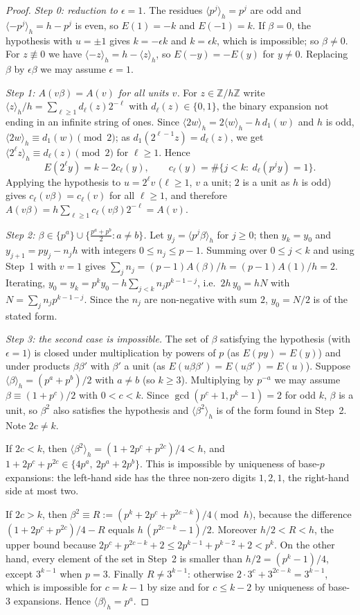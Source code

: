 \documentclass[11pt]{amsart}
\theoremstyle{definition}
\theoremstyle{remark}
\numberwithin{equation}{section}
\newcommand{\Z}{\mathbb{Z}}
\newcommand{\res}[2]{\langle #1\rangle_{#2}}
\begin{document}
\begin{proof}
\emph{Step 0: reduction to $\epsilon=1$.} The residues $\res{p^j}{h}=p^j$ are odd and $\res{-p^j}{h}=h-p^j$ is even, so $E(1)=-k$
and $E(-1)=k$. If $\beta=0$, the hypothesis with $u=\pm1$ gives $k=-\epsilon k$ and $k=\epsilon k$, which is impossible; so
$\beta\ne0$. For $z\not\equiv0$ we have $\res{-z}{h}=h-\res{z}{h}$, so $E(-y)=-E(y)$ for $y\ne0$. Replacing $\beta$ by $\epsilon\beta$
we may assume $\epsilon=1$.

\emph{Step 1: $A(v\beta)=A(v)$ for all units $v$.} For $z\in\Z/h\Z$ write $\res{z}{h}/h=\sum_{\ell\ge1}d_\ell(z)2^{-\ell}$ with
$d_\ell(z)\in\{0,1\}$, the binary expansion not ending in an infinite string of ones. Since
$\res{2w}{h}=2\res{w}{h}-h\,d_1(w)$ and $h$ is odd, $\res{2w}{h}\equiv d_1(w)\pmod 2$; as $d_1(2^{\ell-1}z)=d_\ell(z)$, we get
$\res{2^\ell z}{h}\equiv d_\ell(z)\pmod2$ for $\ell\ge1$. Hence
\[
E(2^\ell y)=k-2c_\ell(y),\qquad c_\ell(y)=\#\{j<k:\ d_\ell(p^jy)=1\}.
\]
Applying the hypothesis to $u=2^\ell v$ ($\ell\ge1$, $v$ a unit; $2$ is a unit as $h$ is odd) gives $c_\ell(v\beta)=c_\ell(v)$ for
all $\ell\ge1$, and therefore $A(v\beta)=h\sum_{\ell\ge1}c_\ell(v\beta)2^{-\ell}=A(v)$.

\emph{Step 2: $\beta\in\{p^a\}\cup\{\frac{p^a+p^b}{2}:a\ne b\}$.} Let $y_j=\res{p^j\beta}{h}$ for $j\ge0$; then $y_k=y_0$ and
$y_{j+1}=py_j-n_jh$ with integers $0\le n_j\le p-1$. Summing over $0\le j<k$ and using Step~1 with $v=1$ gives
$\sum_jn_j=(p-1)A(\beta)/h=(p-1)A(1)/h=2$. Iterating, $y_0=y_k=p^ky_0-h\sum_{j<k}n_jp^{k-1-j}$, i.e.\ $2h\,y_0=hN$ with
$N=\sum_jn_jp^{k-1-j}$. Since the $n_j$ are non-negative with sum $2$, $y_0=N/2$ is of the stated form.

\emph{Step 3: the second case is impossible.} The set of $\beta$ satisfying the hypothesis (with $\epsilon=1$) is closed under
multiplication by powers of $p$ (as $E(py)=E(y)$) and under products $\beta\beta'$ with $\beta'$ a unit (as
$E(u\beta\beta')=E(u\beta')=E(u)$). Suppose $\res{\beta}{h}=(p^a+p^b)/2$ with $a\ne b$ (so $k\ge3$). Multiplying by $p^{-a}$ we may
assume $\beta\equiv(1+p^c)/2$ with $0<c<k$. Since $\gcd(p^c+1,p^k-1)=2$ for odd $k$, $\beta$ is a unit, so $\beta^2$ also satisfies
the hypothesis and $\res{\beta^2}{h}$ is of the form found in Step~2. Note $2c\ne k$.

If $2c<k$, then $\res{\beta^2}{h}=(1+2p^c+p^{2c})/4<h$, and $1+2p^c+p^{2c}\in\{4p^a,\ 2p^a+2p^b\}$. This is impossible by uniqueness
of base-$p$ expansions: the left-hand side has the three non-zero digits $1,2,1$, the right-hand side at most two.

If $2c>k$, then $\beta^2\equiv R:=(p^k+2p^c+p^{2c-k})/4\pmod h$, because the difference $(1+2p^c+p^{2c})/4-R$ equals
$h\,(p^{2c-k}-1)/2$. Moreover $h/2<R<h$, the upper bound because $2p^c+p^{2c-k}+2\le2p^{k-1}+p^{k-2}+2<p^k$. On the other hand,
every element of the set in Step~2 is smaller than $h/2=(p^k-1)/4$, except $3^{k-1}$ when $p=3$. Finally $R\ne3^{k-1}$: otherwise
$2\cdot3^c+3^{2c-k}=3^{k-1}$, which is impossible for $c=k-1$ by size and for $c\le k-2$ by uniqueness of base-$3$ expansions.
Hence $\res{\beta}{h}=p^a$.
\end{proof}
\end{document}
